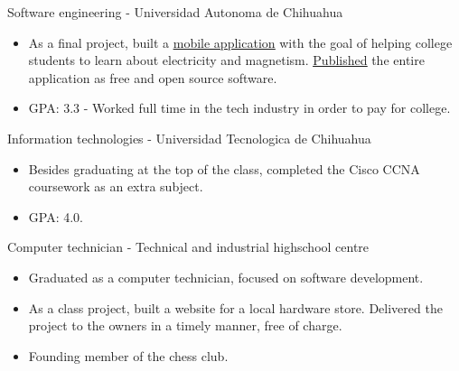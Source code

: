 %
%
%


\begin{scholarship}
        {Software engineering - Universidad Autonoma de Chihuahua}
        {
            \begin{itemize}
                \item As a final project, built a \href{https://play.google.com/store/apps/details?id=net.kippel.gilbert}{\underline{mobile application}}
                    with the goal of helping college students to learn about electricity
                    and magnetism. \href{https://github.com/alanverdugo/gilbert}{\underline{Published}}
                    the entire application as free and open source software.
                \item GPA: 3.3 - Worked full time in the tech industry in order to pay for college.
            \end{itemize}
        }
        {Information technologies - Universidad Tecnologica de Chihuahua}
        {
            \begin{itemize}
                \item Besides graduating at the top of the class, completed the Cisco CCNA coursework as an extra subject.
                \item GPA: 4.0.
            \end{itemize}
        }
        {Computer technician - Technical and industrial highschool centre}
        {
            \begin{itemize}
                \item Graduated as a computer technician, focused on software development.
                \item As a class project, built a website for a local hardware store. Delivered the project to the owners in a timely manner, free of charge.
                \item Founding member of the chess club.
            \end{itemize}
        }
\end{scholarship}